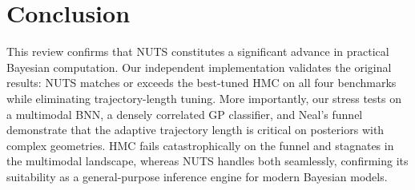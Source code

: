 \documentclass{article}
\begin{document}
\section{Conclusion}

This review confirms that NUTS constitutes a significant advance in practical Bayesian computation. Our independent implementation validates the original results: NUTS matches or exceeds the best-tuned HMC on all four benchmarks while eliminating trajectory-length tuning. More importantly, our stress tests on a multimodal BNN, a densely correlated GP classifier, and Neal's funnel demonstrate that the adaptive trajectory length is critical on posteriors with complex geometries. HMC fails catastrophically on the funnel and stagnates in the multimodal landscape, whereas NUTS handles both seamlessly, confirming its suitability as a general-purpose inference engine for modern Bayesian models.

{\tiny
\setlength{\bibsep}{1pt}   


}
\end{document}
